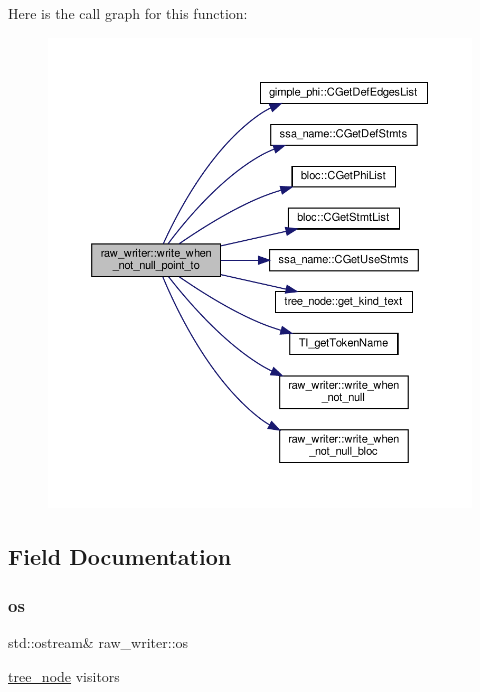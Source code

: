 Here is the call graph for this function\+:
\nopagebreak
\begin{figure}[H]
\begin{center}
\leavevmode
\includegraphics[width=350pt]{d6/df1/structraw__writer_a2f2a7a94272d8523d9e4ca3f6674ceba_cgraph}
\end{center}
\end{figure}


\subsection{Field Documentation}
\mbox{\label{structraw__writer_a118dafa43d8fda99b76fdea39bad99a7}} 
\subsubsection{\texorpdfstring{os}{os}}
{\footnotesize\ttfamily std\+::ostream\& raw\+\_\+writer\+::os\hspace{0.3cm}{\ttfamily [private]}}



\hyperlink{classtree__node}{tree\+\_\+node} visitors 

